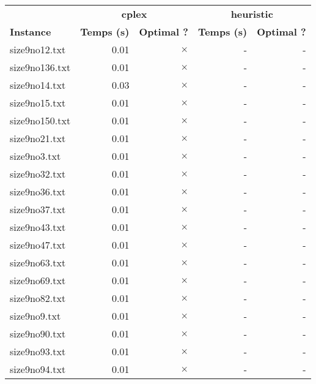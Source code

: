 \documentclass{article}
\begin{document}
\newpage
\begin{center}
\renewcommand{\arraystretch}{1.4} 
 \begin{tabular}{lrrrr}
	\hline
 & \multicolumn{2}{c}{\textbf{cplex}} & \multicolumn{2}{c}{\textbf{heuristic}}\\
\textbf{Instance}  & \textbf{Temps (s)} & \textbf{Optimal ?}  & \textbf{Temps (s)} & \textbf{Optimal ?} \\\hline

size9no12.txt & 0.01 & 
$\times$
 & - & - 
\\
size9no136.txt & 0.01 & 
$\times$
 & - & - 
\\
size9no14.txt & 0.03 & 
$\times$
 & - & - 
\\
size9no15.txt & 0.01 & 
$\times$
 & - & - 
\\
size9no150.txt & 0.01 & 
$\times$
 & - & - 
\\
size9no21.txt & 0.01 & 
$\times$
 & - & - 
\\
size9no3.txt & 0.01 & 
$\times$
 & - & - 
\\
size9no32.txt & 0.01 & 
$\times$
 & - & - 
\\
size9no36.txt & 0.01 & 
$\times$
 & - & - 
\\
size9no37.txt & 0.01 & 
$\times$
 & - & - 
\\
size9no43.txt & 0.01 & 
$\times$
 & - & - 
\\
size9no47.txt & 0.01 & 
$\times$
 & - & - 
\\
size9no63.txt & 0.01 & 
$\times$
 & - & - 
\\
size9no69.txt & 0.01 & 
$\times$
 & - & - 
\\
size9no82.txt & 0.01 & 
$\times$
 & - & - 
\\
size9no9.txt & 0.01 & 
$\times$
 & - & - 
\\
size9no90.txt & 0.01 & 
$\times$
 & - & - 
\\
size9no93.txt & 0.01 & 
$\times$
 & - & - 
\\
size9no94.txt & 0.01 & 
$\times$
 & - & - 
\\
\hline\end{tabular}
\end{center}
\end{document}

